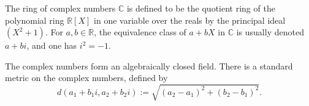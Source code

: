 \documentclass[12pt]{article}
\begin{document}
The ring of complex numbers $\mathbb{C}$ is defined to be the quotient ring of the polynomial ring $\mathbb{R}[X]$ in one variable over the reals by the principal ideal $(X^2+1)$. For $a,b \in \mathbb{R}$, the equivalence class of $a+bX$ in $\mathbb{C}$ is usually denoted $a+bi$, and one has $i^2 = -1$.

The complex numbers form an algebraically closed field. There is a standard metric on the complex numbers, defined by
$$
d(a_1+b_1 i, a_2+b_2 i) := \sqrt{(a_2-a_1)^2 + (b_2-b_1)^2}.
$$
\end{document}
